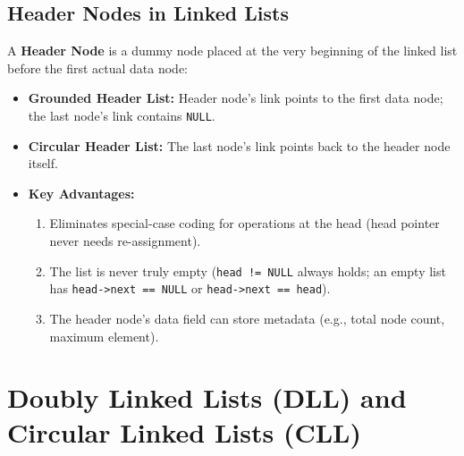 \documentclass[12pt,a4paper]{article}
\begin{document}
\subsection{Header Nodes in Linked Lists}
A \textbf{Header Node} is a dummy node placed at the very beginning of the linked list before the first actual data node:
\begin{itemize}[leftmargin=*, itemsep=2pt]
  \item \textbf{Grounded Header List:} Header node's link points to the first data node; the last node's link contains \texttt{NULL}.
  \item \textbf{Circular Header List:} The last node's link points back to the header node itself.
  \item \textbf{Key Advantages:}
  \begin{enumerate}[leftmargin=*, nosep]
    \item Eliminates special-case coding for operations at the head (head pointer never needs re-assignment).
    \item The list is never truly empty (\texttt{head != NULL} always holds; an empty list has \texttt{head->next == NULL} or \texttt{head->next == head}).
    \item The header node's data field can store metadata (e.g., total node count, maximum element).
  \end{enumerate}
\end{itemize}

\section{Doubly Linked Lists (DLL) and Circular Linked Lists (CLL)}
\end{document}
